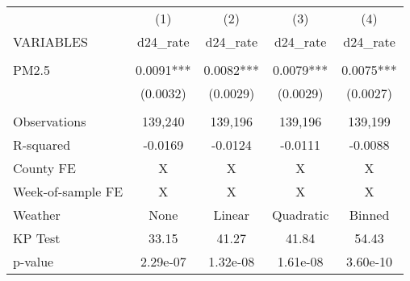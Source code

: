 \begin{tabular}{lcccc} \hline
 & (1) & (2) & (3) & (4) \\
VARIABLES & d24\_rate & d24\_rate & d24\_rate & d24\_rate \\ \hline
 &  &  &  &  \\
PM2.5 & 0.0091*** & 0.0082*** & 0.0079*** & 0.0075*** \\
 & (0.0032) & (0.0029) & (0.0029) & (0.0027) \\
 &  &  &  &  \\
Observations & 139,240 & 139,196 & 139,196 & 139,199 \\
R-squared & -0.0169 & -0.0124 & -0.0111 & -0.0088 \\
County FE & X & X & X & X \\
Week-of-sample FE & X & X & X & X \\
Weather & None & Linear & Quadratic & Binned \\
KP Test & 33.15 & 41.27 & 41.84 & 54.43 \\
 p-value & 2.29e-07 & 1.32e-08 & 1.61e-08 & 3.60e-10 \\ \hline
\end{tabular}
